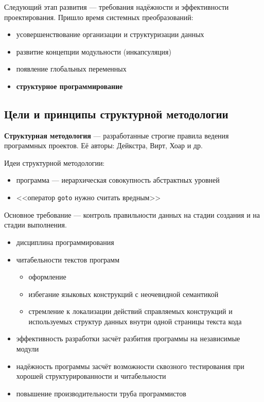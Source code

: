 \subsubsection*{}
Следующий этап развития --- требования надёжности и эффективности проектирования. Пришло время системных преобразований:
\begin{itemize}
  \item усовершенствование организации и структуризации данных
  \item развитие концепции модульности (инкапсуляция)
  \item появление глобальных переменных
  \item \textbf{структурное программирование}
\end{itemize}

\subsection{Цели и принципы структурной методологии}
\textbf{Структурная методология} --- разработанные строгие правила ведения программных проектов. Её авторы: Дейкстра, Вирт, Хоар и др.

Идеи структурной методологии:
\begin{itemize}
  \item программа --- иерархическая совокупность абстрактных уровней
  \item <<оператор \texttt{goto} нужно считать вредным>>
\end{itemize}

Основное требование --- контроль правильности данных на стадии создания и на стадии выполнения.
\begin{itemize}
  \item дисциплина программирования
  \item читабельности текстов программ \begin{itemize}
    \item оформление
    \item избегание языковых конструкций с неочевидной семантикой
    \item стремление к локализации действий справляемых конструкций и используемых структур данных внутри одной страницы текста кода
  \end{itemize}
  \item эффективность разработки засчёт разбития программы на независимые модули
  \item надёжность программы засчёт возможности сквозного тестирования при хорошей структурированности и читабельности
  \item повышение производительности труба программистов
\end{itemize}

